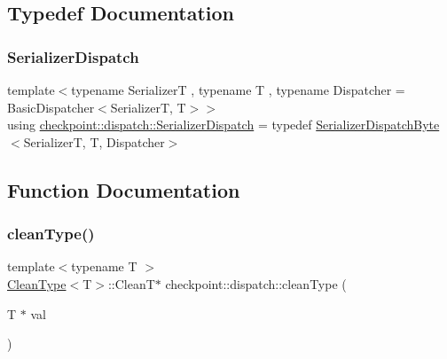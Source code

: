 \subsection{Typedef Documentation}
\mbox{\label{namespacecheckpoint_1_1dispatch_ae3a710db2b07fd1322ab9e6b3bbf45b4}} 
\subsubsection{\texorpdfstring{Serializer\+Dispatch}{SerializerDispatch}}
{\footnotesize\ttfamily template$<$typename SerializerT , typename T , typename Dispatcher  = Basic\+Dispatcher$<$\+Serializer\+T, T$>$$>$ \\
using \hyperlink{namespacecheckpoint_1_1dispatch_ae3a710db2b07fd1322ab9e6b3bbf45b4}{checkpoint\+::dispatch\+::\+Serializer\+Dispatch} = typedef \hyperlink{structcheckpoint_1_1dispatch_1_1_serializer_dispatch_byte}{Serializer\+Dispatch\+Byte}$<$SerializerT, T, Dispatcher$>$}



\subsection{Function Documentation}
\mbox{\label{namespacecheckpoint_1_1dispatch_ad92e256ab5d87d2a5a97ed6ed011af9c}} 
\subsubsection{\texorpdfstring{clean\+Type()}{cleanType()}}
{\footnotesize\ttfamily template$<$typename T $>$ \\
\hyperlink{structcheckpoint_1_1dispatch_1_1_clean_type}{Clean\+Type}$<$T$>$\+::CleanT$\ast$ checkpoint\+::dispatch\+::clean\+Type (\begin{DoxyParamCaption}\item[{T $\ast$}]{val }\end{DoxyParamCaption})}

\mbox{\label{namespacecheckpoint_1_1dispatch_aa6898b55f6fb0de0b628567087cc8755}} 
